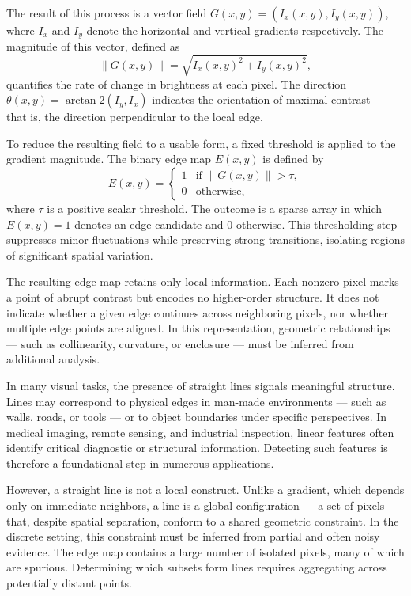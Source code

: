 The result of this process is a vector field $G(x, y) = (I_x(x, y), I_y(x, y))$, where $I_x$ and $I_y$ denote the horizontal and vertical gradients respectively. The magnitude of this vector, defined as
\[
\|G(x, y)\| = \sqrt{I_x(x, y)^2 + I_y(x, y)^2},
\]
quantifies the rate of change in brightness at each pixel. The direction $\theta(x, y) = \arctan2(I_y, I_x)$ indicates the orientation of maximal contrast — that is, the direction perpendicular to the local edge.

To reduce the resulting field to a usable form, a fixed threshold is applied to the gradient magnitude. The binary edge map $E(x, y)$ is defined by
\[
E(x, y) =
\begin{cases}
1 & \text{if } \|G(x, y)\| > \tau, \\
0 & \text{otherwise},
\end{cases}
\]
where $\tau$ is a positive scalar threshold. The outcome is a sparse array in which $E(x, y) = 1$ denotes an edge candidate and $0$ otherwise. This thresholding step suppresses minor fluctuations while preserving strong transitions, isolating regions of significant spatial variation.

The resulting edge map retains only local information. Each nonzero pixel marks a point of abrupt contrast but encodes no higher-order structure. It does not indicate whether a given edge continues across neighboring pixels, nor whether multiple edge points are aligned. In this representation, geometric relationships — such as collinearity, curvature, or enclosure — must be inferred from additional analysis. 

In many visual tasks, the presence of straight lines signals meaningful structure. Lines may correspond to physical edges in man-made environments — such as walls, roads, or tools — or to object boundaries under specific perspectives. In medical imaging, remote sensing, and industrial inspection, linear features often identify critical diagnostic or structural information. Detecting such features is therefore a foundational step in numerous applications.

However, a straight line is not a local construct. Unlike a gradient, which depends only on immediate neighbors, a line is a global configuration — a set of pixels that, despite spatial separation, conform to a shared geometric constraint. In the discrete setting, this constraint must be inferred from partial and often noisy evidence. The edge map contains a large number of isolated pixels, many of which are spurious. Determining which subsets form lines requires aggregating across potentially distant points.

